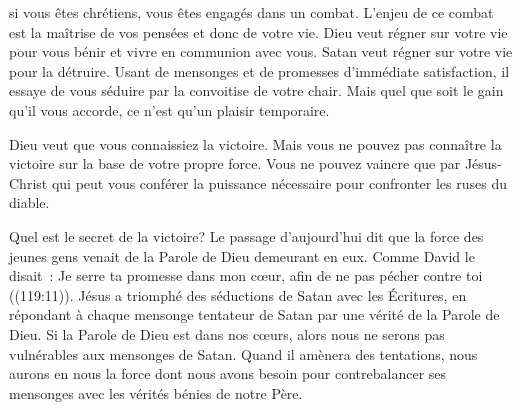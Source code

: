 




 si vous êtes chrétiens,
 vous êtes engagés dans un combat. L'enjeu de ce combat est la maîtrise
 de vos pensées et donc de votre vie. Dieu veut régner sur votre vie
 pour vous bénir et vivre en communion avec vous.
 Satan veut régner sur votre vie pour la détruire.
 Usant de mensonges et de promesses d'immédiate satisfaction,
 il essaye de vous séduire par la convoitise de votre chair.
 Mais quel que soit le gain qu'il vous accorde,
 ce n'est qu'un plaisir temporaire.


Dieu veut que vous connaissiez la victoire. Mais vous ne pouvez pas connaître
 la victoire sur la base de votre propre force. Vous ne pouvez vaincre
 que par Jésus-Christ qui peut vous conférer la puissance nécessaire pour
 confronter les ruses du diable.

Quel est le secret de la victoire? Le passage d'aujourd'hui dit que la force
 des jeunes gens venait de la Parole de Dieu demeurant en eux.
 Comme David le disait~: 
 \og Je serre ta promesse dans mon cœur, afin de ne pas pécher contre toi \fg{}
 ((119:11)).
 Jésus a triomphé des séductions de Satan avec les Écritures, en répondant
 à chaque mensonge tentateur de Satan par une vérité de la Parole de Dieu.
 Si la Parole de Dieu est dans nos c\oe{}urs, alors nous ne serons pas
 vulnérables aux mensonges de Satan.
 Quand il amènera des tentations, nous aurons en nous la force dont nous
 avons besoin pour contrebalancer ses mensonges avec les vérités bénies 
 de notre Père.


\dvrule


